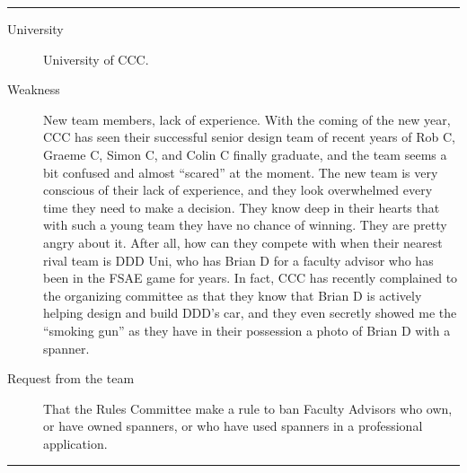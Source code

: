 \documentclass[10pt, a4paper, article, oneside, twocolumn, final]{memoir}
\begin{document}
\plainbreak{2}

\begin{description}
    \item[University] University of CCC.
    \item[Weakness] New team members, lack of experience. With the coming of the new year, CCC has seen their successful senior design team of recent years of Rob C, Graeme C, Simon C, and Colin C finally graduate, and the team seems a bit confused and almost “scared” at the moment. The new team is very conscious of their lack of experience, and they look overwhelmed every time they need to make a decision. They know deep in their hearts that with such a young team they have no chance of winning. They are pretty angry about it. After all, how can they compete with when their nearest rival team is DDD Uni, who has Brian D for a faculty advisor who has been in the FSAE game for years. In fact, CCC has recently complained to the organizing committee as that they know that Brian D is actively helping design and build DDD’s car, and they even secretly showed me the “smoking gun” as they have in their possession a photo of Brian D with a spanner.     
    \item[Request from the team] That the Rules Committee make a rule to ban Faculty Advisors who own, or have owned spanners, or who have used spanners in a professional application.
\end{description}

\plainbreak{2}
\end{document}
